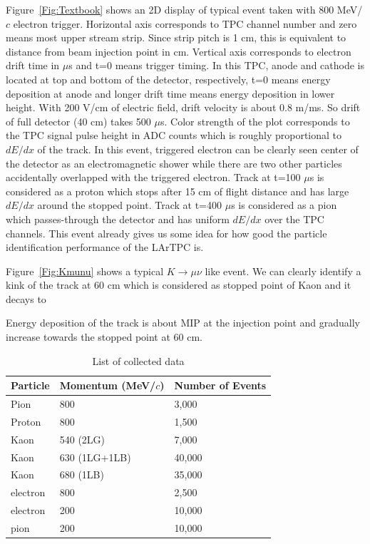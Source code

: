 \documentclass{cernyrep}
\begin{document}
Figure~\ref{Fig:Textbook} shows an 2D display of typical event 
taken with 800 MeV/$c$ electron trigger.
Horizontal axis corresponds to TPC channel number 
and zero means most upper stream strip. 
Since strip pitch is 1 cm, this is equivalent to
distance from beam injection point in cm.
Vertical axis corresponds to electron drift time in $\mu$s
and t=0 means trigger timing. In this TPC, anode and cathode is
located at top and bottom of the detector, respectively,
t=0 means energy deposition at anode and longer drift time 
means energy deposition in lower height.
With 200 V/cm of electric field, drift velocity is about 0.8 m/ms.
So drift of full detector (40 cm) takes 500 $\mu$s.
Color strength of the plot corresponds to the TPC signal pulse height
in ADC counts which is roughly proportional to $dE/dx$ of the track.
In this event, triggered electron can be clearly seen center of the detector
as an electromagnetic shower while there are two other particles 
accidentally overlapped with the triggered electron. 
Track at t=100 $\mu$s is considered as
a proton which stops after 15 cm of flight distance and 
has large $dE/dx$ around the stopped point.
Track at t=400 $\mu$s is considered as
a pion which passes-through the detector and 
has uniform $dE/dx$ over the TPC channels.
This event already gives us some idea for how good 
the particle identification performance of the LArTPC is.

Figure~\ref{Fig:Kmunu} shows a typical $K \to\mu\nu$ like event.
We can clearly identify a kink of the track at 60 cm which is considered
as stopped point of Kaon and it decays to  

Energy deposition of the track is about MIP at the injection point
and gradually increase towards the stopped point at 60 cm.



\begin{table}[h]
\begin{center}
\caption{List of collected data}
\begin{tabular}{l|ll}
  Particle  &Momentum (MeV/$c$) &Number of Events\\
\hline
  Pion      &800                &3,000\\
  Proton    &800                &1,500\\
  Kaon      &540 (2LG)          &7,000\\
  Kaon      &630 (1LG+1LB)      &40,000\\
  Kaon      &680 (1LB)          &35,000\\
  electron  &800                &2,500\\
  electron  &200                &10,000\\
  pion      &200                &10,000\\
\end{tabular}
\label{Table:Data}
\end{center}
\end{table}
\end{document}
